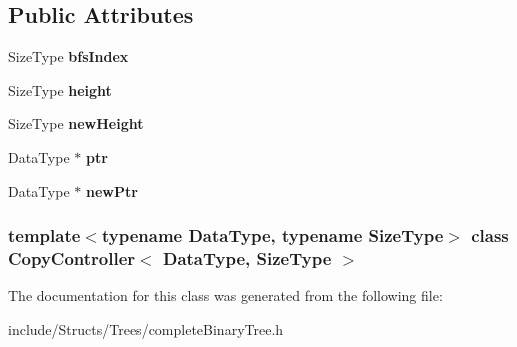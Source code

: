 \subsection*{Public Attributes}
\begin{DoxyCompactItemize}
\item 
\hypertarget{class_copy_controller_a22d642944b5758e7f91c1581f51491e1}{
SizeType {\bfseries bfsIndex}}
\label{class_copy_controller_a22d642944b5758e7f91c1581f51491e1}

\item 
\hypertarget{class_copy_controller_a1f4abeba0df2cbfe2a92654b41cfb7b5}{
SizeType {\bfseries height}}
\label{class_copy_controller_a1f4abeba0df2cbfe2a92654b41cfb7b5}

\item 
\hypertarget{class_copy_controller_a146a8ae82cdda69bbb059813123b3168}{
SizeType {\bfseries newHeight}}
\label{class_copy_controller_a146a8ae82cdda69bbb059813123b3168}

\item 
\hypertarget{class_copy_controller_a687f9df4a8be58bc9bf04d2d1be7951c}{
DataType $\ast$ {\bfseries ptr}}
\label{class_copy_controller_a687f9df4a8be58bc9bf04d2d1be7951c}

\item 
\hypertarget{class_copy_controller_ac74ce0a80f9c445106247ab29941507c}{
DataType $\ast$ {\bfseries newPtr}}
\label{class_copy_controller_ac74ce0a80f9c445106247ab29941507c}

\end{DoxyCompactItemize}
\subsubsection*{template$<$typename DataType, typename SizeType$>$ class CopyController$<$ DataType, SizeType $>$}



The documentation for this class was generated from the following file:\begin{DoxyCompactItemize}
\item 
include/Structs/Trees/completeBinaryTree.h\end{DoxyCompactItemize}
